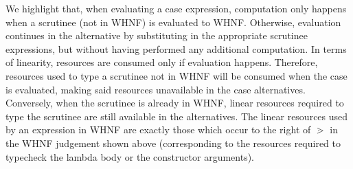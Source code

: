\documentclass[acmsmall,review,anonymous,screen]{acmart}
\begin{document}
We highlight that, when evaluating a case expression, computation only
happens when a scrutinee (not in WHNF) is evaluated to
WHNF. Otherwise, evaluation continues in the alternative by
substituting in the appropriate scrutinee expressions, but without
having performed any additional computation.
%
In terms of linearity, resources are consumed only if evaluation happens.
Therefore, resources used to type a scrutinee not in
WHNF will be consumed when the case is evaluated, making said resources unavailable in the case
alternatives. Conversely, when the scrutinee is already in WHNF, linear
resources required to type the scrutinee are still available in the alternatives.
The linear resources used by an expression in WHNF are exactly those which
occur to the right of $\gtrdot$ in the WHNF judgement shown above
(corresponding to the resources required to typecheck the lambda body or the
constructor arguments).

%
%
%
%
%


\end{document}
